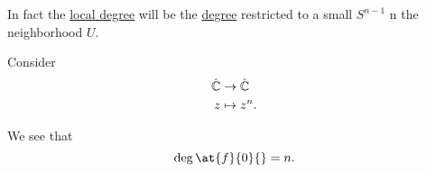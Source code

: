 In fact the \hyperref[def:local-degree]{local degree} will be the \hyperref[def:degree]{degree} restricted to a small \(S^{n - 1}\) n the neighborhood \(U\).
\begin{figure}[H]
	\centering
	\label{fig:computing-local-homology-idea}
\end{figure}

\begin{eg}
	Consider
	\[
		\begin{split}
			\hat{\mathbb{\MakeUppercase{c}}} & \to \hat{\mathbb{\MakeUppercase{c}}}\\
			z&\mapsto z^n.
		\end{split}
	\]

	\begin{figure}[H]
		\centering
		\label{fig:eg:lec31-degree-n}
	\end{figure}

	We see that
	\[
		\deg \at{f}{0}{} = n.
	\]
\end{eg}